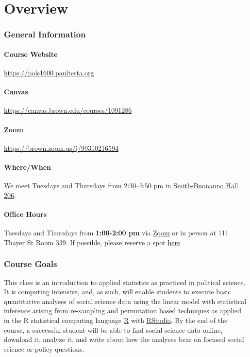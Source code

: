 
\part*{Overview}

\section{General Information}
\subsection{Course Website} \url{https://pols1600.paultesta.org}
\subsection{Canvas} \url{https://canvas.brown.edu/courses/1091286}
\subsection{Zoom} \url{https://brown.zoom.us/j/99310216594}
\subsection{Where/When}
We meet Tuesdays and Thursdays from 2:30--3:50 pm in \href{http://brown.edu/Facilities/Facilities_Management/maps/index.php#building/SMITH-BUON}{Smith-Buonanno Hall 206}.

\subsection{Office Hours}
Tuesdays and Thursdays from \textbf{1:00-2:00 pm} via \href{https://brown.zoom.us/j/96609864723
}{Zoom} or in person at 111 Thayer St Room 339. If possible, please reserve a spot \href{https://calendar.google.com/calendar/u/0/selfsched?sstoken=UUE1T2JWYWtpbmVLfGRlZmF1bHR8YWQ0NmM4NWEyMTYwZWNjYjdkYmE2ODA5NmRmN2RlMmQ}{here}

\section{Course Goals}

This class is an introduction to applied statistics as practiced in political science. It is computing intensive, and, as such, will enable students to execute basic quantitative analyses of social science data using the linear model with statistical inference arising from re-sampling and permutation based techniques as applied in the R statistical computing language \href{https://cran.r-project.org/}{R} with \href{https://www.rstudio.com/}{RStudio}. By the end of the course, a successful student will be able to find social science data online, download it, analyze it, and write about how the analyses bear on focused social science or policy questions.


